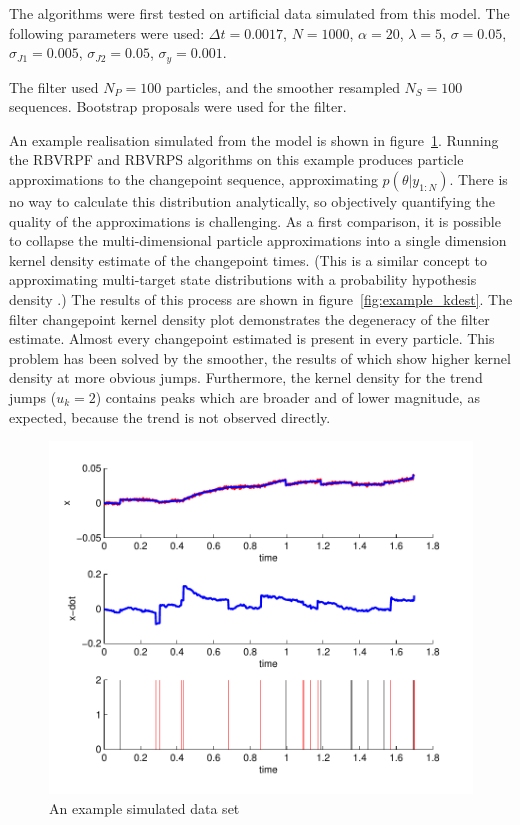 \documentclass[journal]{IEEEtran}
\begin{document}
The algorithms were first tested on artificial data simulated from this model. The following parameters were used: $\Delta t = 0.0017$, $N = 1000$, $\alpha = 20$, $\lambda = 5$, $\sigma = 0.05$, $\sigma_{J1} = 0.005$, $\sigma_{J2} = 0.05$, $\sigma_{y} = 0.001$.

The filter used $N_P = 100$ particles, and the smoother resampled $N_S = 100$ sequences. Bootstrap proposals were used for the filter.

An example realisation simulated from the model is shown in figure~\ref{fig:example_data}. Running the RBVRPF and RBVRPS algorithms on this example produces particle approximations to the changepoint sequence, approximating $p(\theta|y_{1:N})$. There is no way to calculate this distribution analytically, so objectively quantifying the quality of the approximations is challenging. As a first comparison, it is possible to collapse the multi-dimensional particle approximations into a single dimension kernel density estimate of the changepoint times. (This is a similar concept to approximating multi-target state distributions with a probability hypothesis density \cite{Mahler2000,Mahler2003}.) The results of this process are shown in figure~\ref{fig:example_kdest}. The filter changepoint kernel density plot demonstrates the degeneracy of the filter estimate. Almost every changepoint estimated is present in every particle. This problem has been solved by the smoother, the results of which show higher kernel density at more obvious jumps. Furthermore, the kernel density for the trend jumps ($u_k = 2$) contains peaks which are broader and of lower magnitude, as expected, because the trend is not observed directly.

\begin{figure}[!t]
\centering
\includegraphics[width=0.95\columnwidth]{example_data.pdf}
\caption{An example simulated data set}
\label{fig:example_data}
\end{figure}
\end{document}
